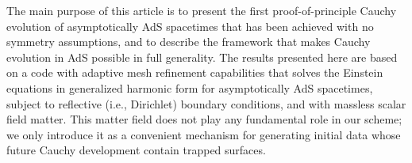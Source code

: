 \documentclass[a4paper,11pt]{article}
\numberwithin{equation}{section}
\begin{document}

The main purpose of this article is to present the first proof-of-principle Cauchy evolution of asymptotically AdS spacetimes that has been achieved with no symmetry assumptions, and to describe the framework that makes Cauchy evolution in AdS possible in full generality.
The results presented here are based on a code with adaptive mesh refinement capabilities that solves the Einstein equations in generalized harmonic form for asymptotically AdS spacetimes, subject to reflective (i.e., Dirichlet) boundary conditions, and with massless scalar field matter. 
This matter field does not play any fundamental role in our scheme; we only introduce it as a convenient mechanism for generating initial data whose future Cauchy development contain trapped surfaces.


\end{document}

